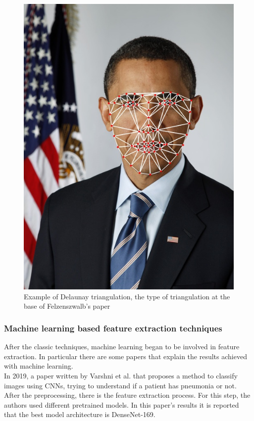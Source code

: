 \documentclass[conference]{IEEEtran}
\begin{document}
					\begin{figure}[!ht]
						\centerline{\includegraphics[height=0.4\textheight]{imgs/delaunay.jpg}}
						\caption{Example of Delaunay triangulation, the type of triangulation at the base of Felzenszwalb's paper}
						\label{fig:3}
					\end{figure}
					
				\subsubsection{Machine learning based feature extraction techniques} \label{mlfe}
					
					After the classic techniques, machine learning began to be involved in feature extraction. In particular there are some papers that explain the results achieved with machine learning.\\
					\noindent In 2019, a paper written by Varshni et al. that proposes a method \cite{varshni2019pneumonia} to classify images using CNNs, trying to understand if a patient 
					has pneumonia or not. After the preprocessing, there is the feature extraction process. For this step, the authors used different pretrained models.
					In this paper's results it is reported that the best model architecture is DenseNet-169.
					
\end{document}
